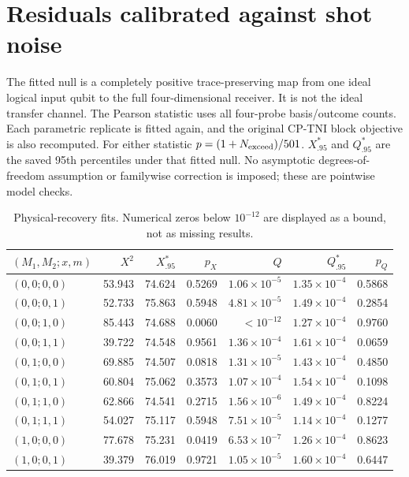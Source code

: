 \documentclass[10pt,a4paper]{article}
\begin{document}
\section{Residuals calibrated against shot noise}
The fitted null is a completely positive trace-preserving map from one ideal logical input qubit to the full four-dimensional receiver. It is not the ideal transfer channel. The Pearson statistic uses all four-probe basis/outcome counts. Each parametric replicate is fitted again, and the original CP-TNI block objective is also recomputed. For either statistic $p=(1+N_{\rm exceed})/501$. $X^*_{.95}$ and $Q^*_{.95}$ are the saved 95th percentiles under that fitted null. No asymptotic degrees-of-freedom assumption or familywise correction is imposed; these are pointwise model checks.
\par\begin{table}[htbp]\centering\footnotesize
\caption{Physical-recovery fits. Numerical zeros below $10^{-12}$ are displayed as a bound, not as missing results.}\label{stab:gof_physical}
\begin{tabular}{lrrrrrr}\toprule
$(M_1,M_2;x,m)$ & $X^2$ & $X^*_{.95}$ & $p_X$ & $Q$ & $Q^*_{.95}$ & $p_Q$\\\midrule
$(0,0;0,0)$ & 53.943 & 74.624 & 0.5269 & $1.06\times10^{-5}$ & $1.35\times10^{-4}$ & 0.5868 \\
$(0,0;0,1)$ & 52.733 & 75.863 & 0.5948 & $4.81\times10^{-5}$ & $1.49\times10^{-4}$ & 0.2854 \\
$(0,0;1,0)$ & 85.443 & 74.688 & 0.0060 & $<10^{-12}$ & $1.27\times10^{-4}$ & 0.9760 \\
$(0,0;1,1)$ & 39.722 & 74.548 & 0.9561 & $1.36\times10^{-4}$ & $1.61\times10^{-4}$ & 0.0659 \\
$(0,1;0,0)$ & 69.885 & 74.507 & 0.0818 & $1.31\times10^{-5}$ & $1.43\times10^{-4}$ & 0.4850 \\
$(0,1;0,1)$ & 60.804 & 75.062 & 0.3573 & $1.07\times10^{-4}$ & $1.54\times10^{-4}$ & 0.1098 \\
$(0,1;1,0)$ & 62.866 & 74.541 & 0.2715 & $1.56\times10^{-6}$ & $1.49\times10^{-4}$ & 0.8224 \\
$(0,1;1,1)$ & 54.027 & 75.117 & 0.5948 & $7.51\times10^{-5}$ & $1.14\times10^{-4}$ & 0.1277 \\
$(1,0;0,0)$ & 77.678 & 75.231 & 0.0419 & $6.53\times10^{-7}$ & $1.26\times10^{-4}$ & 0.8623 \\
$(1,0;0,1)$ & 39.379 & 76.019 & 0.9721 & $1.05\times10^{-5}$ & $1.60\times10^{-4}$ & 0.6447 \\

\end{tabular}
\end{table}
\end{document}
